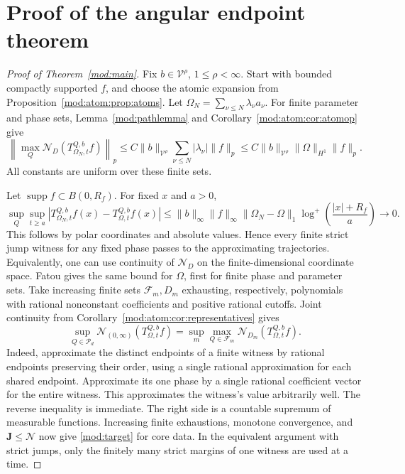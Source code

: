 \documentclass[11pt]{article}
\numberwithin{equation}{section}
\theoremstyle{remark}
\theoremstyle{definition}
\newcommand{\supp}{\operatorname{supp}}
\newcommand{\norm}[1]{\lVert #1\rVert}
\newcommand{\NN}{\mathcal N}
\newcommand{\PP}{\mathcal P}
\begin{document}
\section{Proof of the angular endpoint theorem}\label{mod:atom:sec:mainproof}
\begin{proof}[Proof of Theorem~\ref{mod:main}]
Fix $b\in\mathcal V^\rho$, $1\le\rho<\infty$. Start with
bounded compactly supported $f$, and choose the atomic
expansion from Proposition~\ref{mod:atom:prop:atoms}. Let
$\Omega_N=\sum_{\nu\le N}\lambda_\nu a_\nu$.
For finite parameter and phase sets, Lemma~\ref{mod:pathlemma} and Corollary~\ref{mod:atom:cor:atomop} give
\[
 \left\|\max_Q\NN_D(T_{\Omega_N,t}^{Q,b}f)\right\|_p
 \le C\|b\|_{\mathcal V^\rho}\sum_{\nu\le N}|\lambda_\nu|\norm f_p
 \le C\|b\|_{\mathcal V^\rho}\|\Omega\|_{H^1}\norm f_p.
\]
All constants are uniform over these finite sets.

Let $\supp f\subset B(0,R_f)$. For fixed $x$ and $a>0$,
\begin{equation}\label{mod:atom:eq:atomic-limit}
 \sup_Q\sup_{t\ge a}|T_{\Omega_N,t}^{Q,b}f(x)-T_{\Omega,t}^{Q,b}f(x)|
 \le\|b\|_\infty\norm f_\infty\norm{\Omega_N-\Omega}_1
 \log^+\left(\frac{|x|+R_f}{a}\right)\longrightarrow0.
\end{equation}
This follows by polar coordinates and absolute values. Hence every finite
strict jump witness for any fixed phase passes to the approximating
trajectories. Equivalently, one can use continuity of $\NN_D$ on the
finite-dimensional coordinate space. Fatou gives the same bound for
$\Omega$, first for finite phase and parameter sets. Take increasing
finite sets $\mathcal F_m,D_m$ exhausting, respectively, polynomials
with rational nonconstant coefficients and positive rational cutoffs.
Joint continuity from Corollary~\ref{mod:atom:cor:representatives} gives
\[
 \sup_{Q\in\PP_d}\NN_{(0,\infty)}(T^{Q,b}_{\Omega,t}f)
 =\sup_m\max_{Q\in\mathcal F_m}\NN_{D_m}(T^{Q,b}_{\Omega,t}f).
\]
Indeed, approximate the distinct endpoints of a finite witness by
rational endpoints preserving their order, using a single rational
approximation for each shared endpoint. Approximate its one phase by
a single rational coefficient vector for the entire witness. This
approximates the witness's value arbitrarily well. The reverse
inequality is immediate. The right side is a countable supremum of
measurable functions. Increasing finite exhaustions, monotone
convergence, and $\mathbf J\le\NN$ now give \eqref{mod:target} for
core data. In the equivalent argument with strict jumps, only the
finitely many strict margins of one witness are used at a time.


\end{proof}
\end{document}
